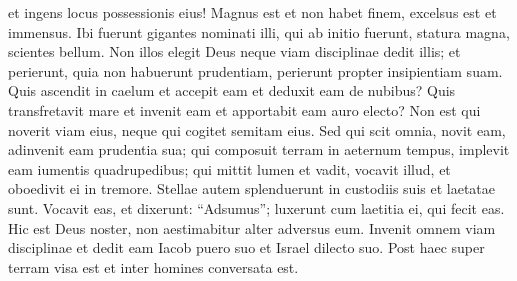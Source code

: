 \begin{biblechapter}
\begin{biblechapter}
\begin{biblechapter}
 et ingens locus possessionis eius!
 \verse Magnus est et non habet finem,
 excelsus est et immensus.
 \verse Ibi fuerunt gigantes nominati illi, qui ab initio fuerunt,
 statura magna, scientes bellum.
 \verse Non illos elegit Deus
 neque viam disciplinae dedit illis;
 \verse et perierunt, quia non habuerunt prudentiam,
 perierunt propter insipientiam suam.
 \verse Quis ascendit in caelum et accepit eam
 et deduxit eam de nubibus?
 \verse Quis transfretavit mare et invenit eam
 et apportabit eam auro electo?
 \verse Non est qui noverit viam eius,
 neque qui cogitet semitam eius.
 \verse Sed qui scit omnia, novit eam,
 adinvenit eam prudentia sua;
 qui composuit terram in aeternum tempus,
 implevit eam iumentis quadrupedibus;
 \verse qui mittit lumen et vadit,
 vocavit illud, et oboedivit ei in tremore.
 \verse Stellae autem splenduerunt in custodiis suis
 et laetatae sunt.
 \verse Vocavit eas, et dixerunt: “Adsumus”;
 luxerunt cum laetitia ei, qui fecit eas.
 \verse Hic est Deus noster,
 non aestimabitur alter adversus eum.
 \verse Invenit omnem viam disciplinae
 et dedit eam Iacob puero suo
 et Israel dilecto suo.
 \verse Post haec super terram visa est
 et inter homines conversata est.
 

\end{biblechapter}
\end{biblechapter}
\end{biblechapter}
